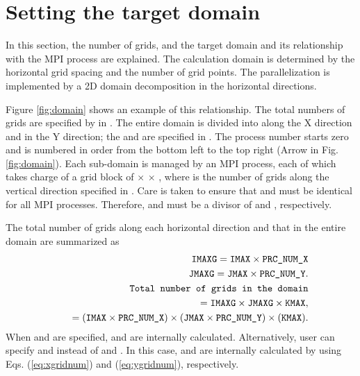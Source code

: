 \section{Setting the target domain} \label{sec:domain}

In this section, the number of grids, and the target domain and its relationship with the MPI process are explained.
The calculation domain is determined by the horizontal grid spacing and the number of grid points.
The parallelization is implemented by a 2D domain decomposition in the horizontal directions.

Figure \ref{fig:domain} shows an example of this relationship.
The total numbers of grids are specified by  in .
The entire domain is divided into  along the X direction and  in the Y direction; the  and  are specified in .
The process number starts zero and is numbered in order from the bottom left to the top right (Arrow in Fig. \ref{fig:domain}).
Each sub-domain is managed by an MPI process, each of which takes charge of a grid block of  $\times$  $\times$ ,
where  is the number of grids along the vertical direction specified in .
Care is taken to ensure that  and  must be identical for all MPI processes.
Therefore,  and  must be a divisor of  and , respectively.

The total number of grids along each horizontal direction and that in the entire domain are summarized as
\begin{eqnarray}
  && \nmitemeq{IMAXG} = \nmitemeq{IMAX} \times \nmitemeq{PRC_NUM_X}
  \label{eq:xgridnum}\\
  && \nmitemeq{JMAXG} = \nmitemeq{JMAX} \times \nmitemeq{PRC_NUM_Y}.
  \label{eq:ygridnum}\\
&& \verb|Total number of grids in the domain| \nonumber\\
&&\quad = \nmitemeq{IMAXG} \times \nmitemeq{JMAXG} \times \nmitemeq{KMAX}, \nonumber\\
&&\quad = \left(\nmitemeq{IMAX} \times \nmitemeq{PRC_NUM_X}\right)
          \times (\nmitemeq{JMAX} \times \nmitemeq{PRC_NUM_Y})
          \times (\nmitemeq{KMAX} ).
\end{eqnarray}
When  and  are specified,  and  are internally calculated.
Alternatively, user can specify  and  instead of  and .
In this case,  and  are internally calculated by using Eqs. (\ref{eq:xgridnum}) and (\ref{eq:ygridnum}), respectively.




